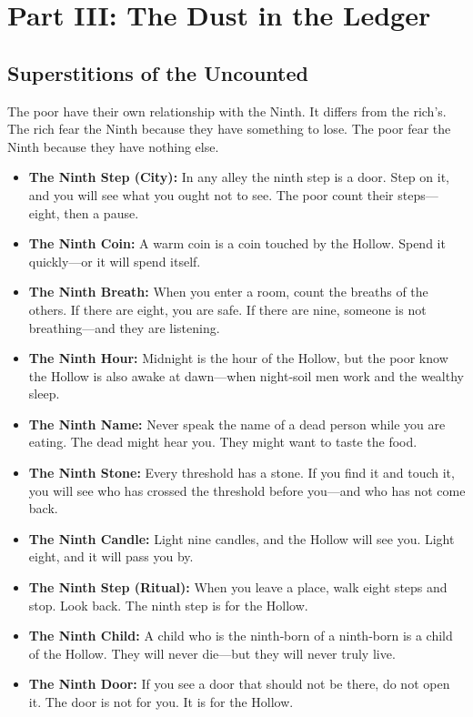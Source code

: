 \documentclass[11pt]{article}
\begin{document}
\section{Part III: The Dust in the Ledger}
\subsection{Superstitions of the Uncounted}
The poor have their own relationship with the Ninth. It differs from the rich’s. The rich fear the Ninth because they have something to lose. The poor fear the Ninth because they have nothing else.

\begin{itemize}
\item \textbf{The Ninth Step (City):} In any alley the ninth step is a door. Step on it, and you will see what you ought not to see. The poor count their steps—eight, then a pause.
\item \textbf{The Ninth Coin:} A warm coin is a coin touched by the Hollow. Spend it quickly—or it will spend itself.
\item \textbf{The Ninth Breath:} When you enter a room, count the breaths of the others. If there are eight, you are safe. If there are nine, someone is not breathing—and they are listening.
\item \textbf{The Ninth Hour:} Midnight is the hour of the Hollow, but the poor know the Hollow is also awake at dawn—when night‑soil men work and the wealthy sleep.
\item \textbf{The Ninth Name:} Never speak the name of a dead person while you are eating. The dead might hear you. They might want to taste the food.
\item \textbf{The Ninth Stone:} Every threshold has a stone. If you find it and touch it, you will see who has crossed the threshold before you—and who has not come back.
\item \textbf{The Ninth Candle:} Light nine candles, and the Hollow will see you. Light eight, and it will pass you by.
\item \textbf{The Ninth Step (Ritual):} When you leave a place, walk eight steps and stop. Look back. The ninth step is for the Hollow.
\item \textbf{The Ninth Child:} A child who is the ninth‑born of a ninth‑born is a child of the Hollow. They will never die—but they will never truly live.
\item \textbf{The Ninth Door:} If you see a door that should not be there, do not open it. The door is not for you. It is for the Hollow.
\end{itemize}
\end{document}
